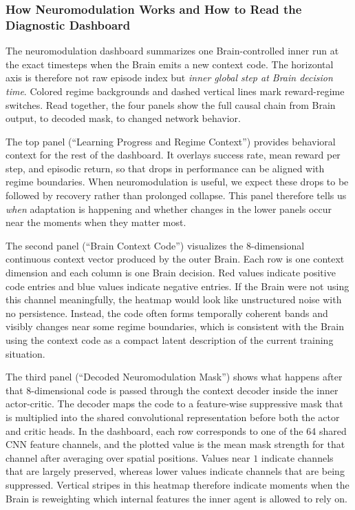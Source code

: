 ﻿\documentclass[sigconf]{acmart}
\begin{document}
\subsubsection{How Neuromodulation Works and How to Read the Diagnostic Dashboard}
The neuromodulation dashboard summarizes one Brain-controlled inner run at the exact timesteps when the Brain emits a new context code. The horizontal axis is therefore not raw episode index but \emph{inner global step at Brain decision time}. Colored regime backgrounds and dashed vertical lines mark reward-regime switches. Read together, the four panels show the full causal chain from Brain output, to decoded mask, to changed network behavior.

The top panel (``Learning Progress and Regime Context'') provides behavioral context for the rest of the dashboard. It overlays success rate, mean reward per step, and episodic return, so that drops in performance can be aligned with regime boundaries. When neuromodulation is useful, we expect these drops to be followed by recovery rather than prolonged collapse. This panel therefore tells us \emph{when} adaptation is happening and whether changes in the lower panels occur near the moments when they matter most.

The second panel (``Brain Context Code'') visualizes the 8-dimensional continuous context vector produced by the outer Brain. Each row is one context dimension and each column is one Brain decision. Red values indicate positive code entries and blue values indicate negative entries. If the Brain were not using this channel meaningfully, the heatmap would look like unstructured noise with no persistence. Instead, the code often forms temporally coherent bands and visibly changes near some regime boundaries, which is consistent with the Brain using the context code as a compact latent description of the current training situation.

The third panel (``Decoded Neuromodulation Mask'') shows what happens after that 8-dimensional code is passed through the context decoder inside the inner actor-critic. The decoder maps the code to a feature-wise suppressive mask that is multiplied into the shared convolutional representation before both the actor and critic heads. In the dashboard, each row corresponds to one of the 64 shared CNN feature channels, and the plotted value is the mean mask strength for that channel after averaging over spatial positions. Values near $1$ indicate channels that are largely preserved, whereas lower values indicate channels that are being suppressed. Vertical stripes in this heatmap therefore indicate moments when the Brain is reweighting which internal features the inner agent is allowed to rely on.
\end{document}

